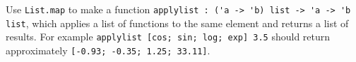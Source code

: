 Use \lstinline{List.map} to make a function \lstinline{applylist : ('a -> 'b) list -> 'a -> 'b list}, which applies a list of functions to the same element and returns a list of results. For example \lstinline{applylist [cos; sin; log; exp] 3.5} should return approximately \lstinline{[-0.93; -0.35; 1.25; 33.11]}.